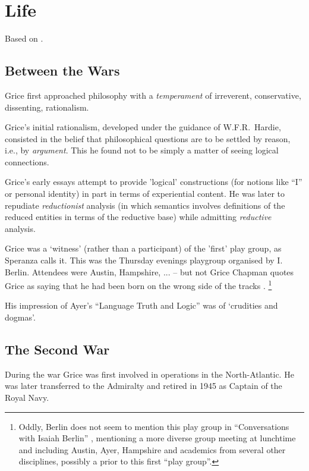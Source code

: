 \documentclass[10pt,titlepage]{book}
\begin{document}
\section{Life}

Based on \cite{grice86c}.

\subsection{Between the Wars}

Grice first approached philosophy with a \emph{temperament} of irreverent, conservative, dissenting, rationalism.

Grice's initial rationalism, developed under the guidance of W.F.R.~Hardie, consisted in the belief that philosophical questions are to be settled by reason, i.e., by \emph{argument}.
This he found not to be simply a matter of seeing logical connections.

Grice's early essays attempt to provide 'logical' constructions (for notions like ``I'' or  personal identity) in part in terms of experiential content.
He was later to repudiate \emph{reductionist} analysis (in which semantics involves definitions of the reduced entities in terms of the reductive base) while admitting \emph{reductive} analysis. 

Grice was a `witness' (rather than a participant) of the 'first' play group, as Speranza calls it.
This  was the Thursday evenings playgroup organised by I. Berlin.
Attendees were Austin, Hampshire, ... -- but not Grice
Chapman quotes Grice as saying that he had been born on the wrong side of the tracks \cite{chapman2006}.
\footnote{Oddly, Berlin does not seem to mention this play group in ``Conversations with Isaiah Berlin'' \cite{berlin91}, mentioning a more diverse group meeting at lunchtime and including Austin, Ayer, Hampshire and academics from several other disciplines, possibly a prior to this first ``play group''.}

His impression of Ayer's ``Language Truth and Logic'' \cite{ayer1936} was of `crudities and dogmas'.

\subsection{The Second War}

During the war Grice was first involved in operations in the North-Atlantic.
He was later transferred to the Admiralty and retired in 1945 as Captain of the Royal  
Navy.
\end{document}

